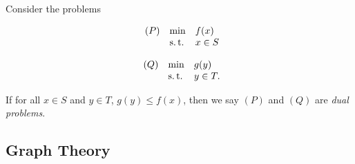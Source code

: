 \begin{defn}
    \label{def:dual-problems}
    Consider the problems
    \begin{multicols}{2}
        \noindent
        \begin{equation*}
        \begin{array}{lll@{}}
            (P)     & \min  &  f(x)     \\
                    & \st   &   x \in S \\
        \end{array}
        \end{equation*}
        
        \noindent
        \begin{equation*}
        \begin{array}{lll@{}}
            (Q)     & \min  &  g(y)     \\
                    & \st   &   y \in T. \\
        \end{array}
        \end{equation*}
    \end{multicols}
    If for all $x \in S$ and $y \in T$, $g(y) \le f(x)$, then we say $(P)$ and $(Q)$ are \textit{dual problems}.
\end{defn}


\subsection{Graph Theory}
\label{subsec:graph-theory}

